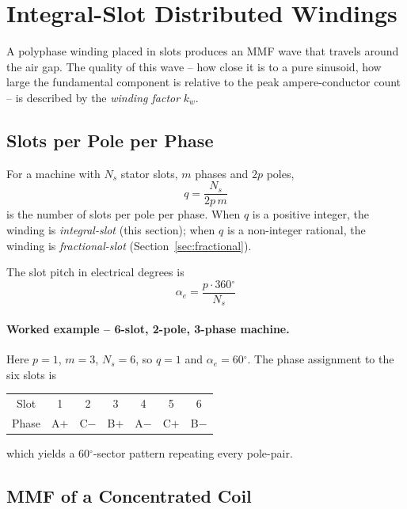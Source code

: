\documentclass[12pt,a4paper]{article}
\newcommand{\degree}{\ensuremath{^{\circ}}}
\begin{document}
\section{Integral-Slot Distributed Windings}
\label{sec:integral}

A polyphase winding placed in slots produces an MMF wave that travels
around the air gap. The quality of this wave -- how close it is to a
pure sinusoid, how large the fundamental component is relative to the
peak ampere-conductor count -- is described by the
\emph{winding factor} $k_w$.

\subsection{Slots per Pole per Phase}

For a machine with $N_s$ stator slots, $m$ phases and $2p$ poles,
\begin{equation}
  q = \frac{N_s}{2p\,m}
  \label{eq:q}
\end{equation}
is the number of slots per pole per phase. When $q$ is a positive
integer, the winding is \emph{integral-slot} (this section); when $q$
is a non-integer rational, the winding is \emph{fractional-slot}
(Section~\ref{sec:fractional}).

The slot pitch in electrical degrees is
\begin{equation}
  \alpha_e = \frac{p \cdot 360\degree}{N_s}
\end{equation}

\paragraph{Worked example -- 6-slot, 2-pole, 3-phase machine.}
Here $p=1$, $m=3$, $N_s=6$, so $q=1$ and $\alpha_e = 60\degree$.
The phase assignment to the six slots is
\begin{center}
  \begin{tabular}{c|cccccc}
    \toprule
    Slot   & 1 & 2 & 3 & 4 & 5 & 6 \\
    Phase  & A$+$ & C$-$ & B$+$ & A$-$ & C$+$ & B$-$ \\
    \bottomrule
  \end{tabular}
\end{center}
which yields a 60\degree-sector pattern repeating every pole-pair.

\subsection{MMF of a Concentrated Coil}
\end{document}

